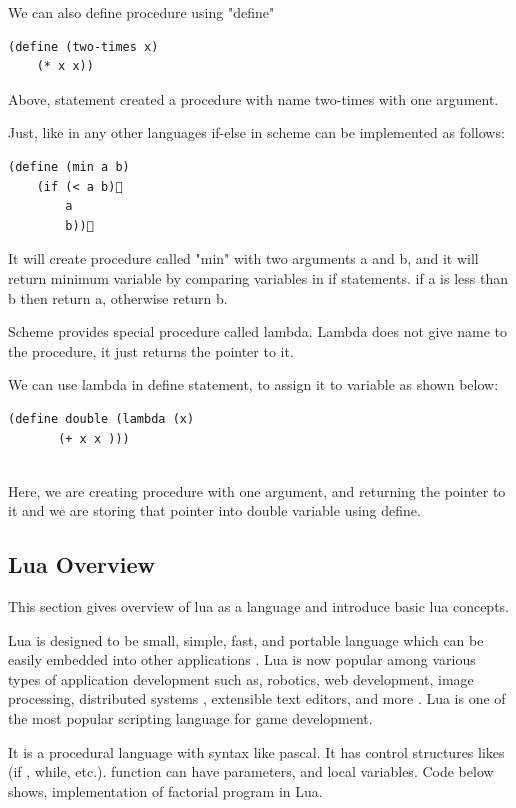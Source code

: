 We can also define procedure using "define"

\begin{lstlisting}[frame=single]  
(define (two-times x)
	(* x x))
\end{lstlisting}


Above, statement created a procedure with name two-times with one argument. 

Just, like in any other languages if-else in scheme can be implemented as follows:



\begin{lstlisting}[frame=single]  
(define (min a b)
	(if (< a b)
		a	
		b))
\end{lstlisting}

It will create procedure called "min" with two arguments a and b, and it will return minimum variable by comparing variables in if statements. if a is less than b then return a, otherwise return b.

Scheme provides special procedure called lambda. Lambda does not give name to the procedure, it just returns the pointer to it.

We can use lambda in define statement, to assign it to variable as shown below:

\begin{lstlisting}[frame=single]  
	(define double (lambda (x)
	   (+ x x )))
 
\end{lstlisting}


Here, we are creating procedure with one argument, and returning the pointer to it and we are storing that pointer into double variable using define.	 

\subsection{Lua Overview}

This section gives overview of lua as a language and introduce basic lua concepts. 

Lua is designed to be small, simple, fast, and portable language which can be easily embedded into other applications \cite{spe96}. Lua is now popular among various types of application development such as, robotics, web development, image processing, distributed systems , extensible text editors, and more \cite{luaprojects}. Lua is one of the most popular scripting language for game development.

It is a procedural language with syntax like pascal. It has control structures likes (if , while, etc.). function can have parameters, and local variables. Code below shows, implementation of factorial program in Lua.

